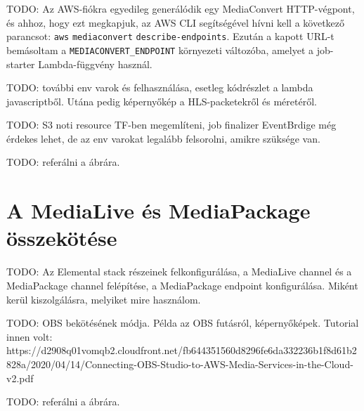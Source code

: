 TODO: Az AWS-fiókra egyedileg generálódik egy MediaConvert HTTP-végpont, és ahhoz, hogy ezt megkapjuk, az AWS CLI segítségével hívni kell a következő parancsot: \verb|aws| \verb|mediaconvert| \verb|describe-endpoints|. Ezután a kapott URL-t bemásoltam a \verb|MEDIACONVERT_ENDPOINT| környezeti változóba, amelyet a job-starter Lambda-függvény használ.

TODO: további env varok és felhasználása, esetleg kódrészlet a lambda javascriptből. Utána pedig képernyőkép a HLS-packetekről és méretéről.

TODO: S3 noti resource TF-ben megemlíteni, job finalizer EventBrdige még érdekes lehet, de az env varokat legalább felsorolni, amikre szüksége van.

TODO: referálni a  ábrára.

\section{A MediaLive és MediaPackage összekötése}

TODO: Az Elemental stack részeinek felkonfigurálása, a MediaLive channel és a MediaPackage channel felépítése, a MediaPackage endpoint konfigurálása. Miként kerül kiszolgálásra, melyiket mire használom. 

TODO: OBS bekötésének módja. Példa az OBS futásról, képernyőképek. Tutorial innen volt: https://d2908q01vomqb2.cloudfront.net/fb644351560d8296fe6da332236b1f8d61b2828a/2020/04/14/Connecting-OBS-Studio-to-AWS-Media-Services-in-the-Cloud-v2.pdf

TODO: referálni a  ábrára.
